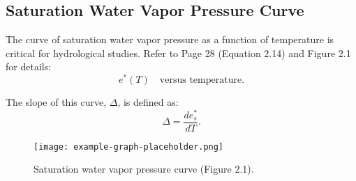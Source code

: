 \documentclass[11pt]{article}
\begin{document}
	\subsection*{Saturation Water Vapor Pressure Curve}
	The curve of saturation water vapor pressure as a function of temperature is critical for hydrological studies. Refer to Page 28 (Equation 2.14) and Figure 2.1 for details:
	\[
	e^*(T) \quad \text{versus temperature}.
	\]
	
	The slope of this curve, $\Delta$, is defined as:
	\[
	\Delta = \frac{de_s^*}{dT}.
	\]
	
	\begin{figure}[h!]
		\centering
		\texttt{[image: example-graph-placeholder.png]} %
		\caption{Saturation water vapor pressure curve (Figure 2.1).}
	\end{figure}
	
\end{document}
